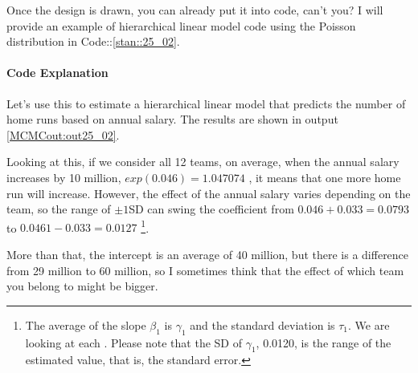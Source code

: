 \documentclass{ltjsbook}
\begin{document}
Once the design is drawn, you can already put it into code, can't you?
I will provide an example of hierarchical linear model code using the Poisson distribution in Code::\ref{stan::25_02}.



\paragraph{Code Explanation}


Let's use this to estimate a hierarchical linear model that predicts the number of home runs based on annual salary. The results are shown in output \ref{MCMCout:out25_02}.

Looking at this, if we consider all 12 teams, on average, when the annual salary increases by 10 million, $exp(0.046)=1.047074$ , it means that one more home run will increase. However, the effect of the annual salary varies depending on the team, so the range of $\pm1$SD can swing the coefficient from $0.046+0.033=0.0793$ to $0.0461-0.033=0.0127$ \footnote{The average of the slope $\beta_1$ is $\gamma_1$ and the standard deviation is $\tau_1$. We are looking at each . Please note that the SD of $\gamma_1$, 0.0120, is the range of the estimated value, that is, the standard error.}.

More than that, the intercept is an average of 40 million, but there is a difference from 29 million to 60 million, so I sometimes think that the effect of which team you belong to might be bigger.
\end{document}
